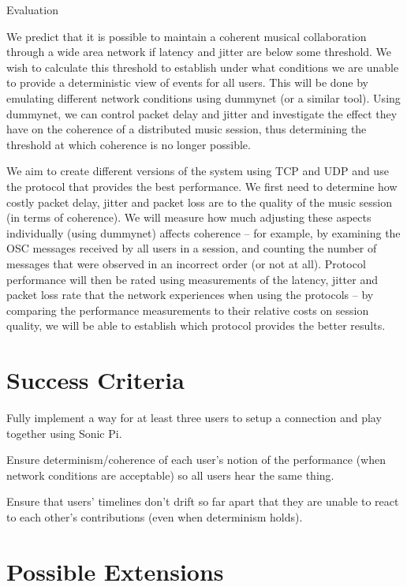 \documentclass[12pt,a4paper,twoside]{article}
\begin{document}
\large
Evaluation

\normalsize

We predict that it is possible to maintain a coherent musical collaboration through a wide area network if latency and jitter are below some threshold. We wish to calculate this threshold to establish under what conditions we are unable to provide a deterministic view of events for all users. This will be done by emulating different network conditions using dummynet (or a similar tool). Using dummynet, we can control packet delay and jitter and investigate the effect they have on the coherence of a distributed music session, thus determining the threshold at which coherence is no longer possible.

We aim to create different versions of the system using TCP and UDP and use the protocol that provides the best performance. We first need to determine how costly packet delay, jitter and packet loss are to the quality of the music session (in terms of coherence). We will measure how much adjusting these aspects individually (using dummynet) affects coherence -- for example, by examining the OSC messages received by all users in a session, and counting the number of messages that were observed in an incorrect order (or not at all). Protocol performance will then be rated using measurements of the latency, jitter and packet loss rate that the network experiences when using the protocols -- by comparing the performance measurements to their relative costs on session quality, we will be able to establish which protocol provides the better results.


\section*{Success Criteria}

Fully implement a way for at least three users to setup a connection and play together using Sonic Pi.

Ensure determinism/coherence of each user's notion of the performance (when network conditions are acceptable) so all users hear the same thing.

Ensure that users' timelines don't drift so far apart that they are unable to react to each other's contributions (even when determinism holds).


\section*{Possible Extensions}
\end{document}
